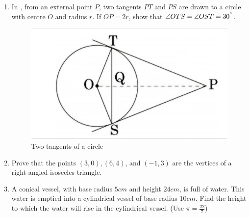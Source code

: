 \documentclass{article}
\begin{document}
\begin{enumerate}
\item In , from an external point $P$, two tangents $PT$ and $PS$ are drawn to a circle with centre $O$ and radius $r$. If $OP = 2r$, show that $\angle OTS = \angle OST = 30^{\degree}$. 
\begin{figure}[H]  
\includegraphics[width=\columnwidth]{./figs/tangentofcircle.jpg}                                                                                        \caption{Two tangents of a circle}                                                                                                                      \label{fig:tangentofcircle}                                                                                                                             \end{figure}                                                                                                                                          
\item Prove that the points $(3, 0), (6, 4)$, and $(-1, 3)$ are the vertices of a right-angled isosceles triangle.
\item A conical vessel, with base radius $5cm$ and height $24cm$, is full of water. This water is emptied into a cylindrical vessel of base radius $10 cm$. Find the height to which the water will rise in the cylindrical vessel. (Use $\pi = \frac{22}{7}$)                                                                                                                                                                                                                                                                                                                                                             

\end{enumerate}
\end{document}

